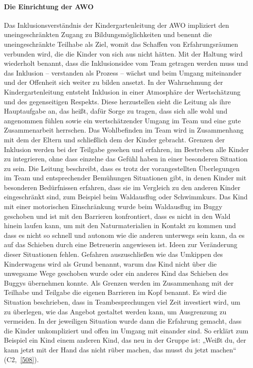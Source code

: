 \paragraph{Die Einrichtung der AWO}
Das Inklusionsverständnis der Kindergartenleitung der AWO impliziert den uneingeschränkten Zugang zu Bildungsmöglichkeiten und benennt die uneingeschränkte Teilhabe als Ziel, womit das Schaffen von Erfahrungsräumen verbunden wird, die die Kinder von sich aus nicht hätten. 
Mit der Haltung wird wiederholt benannt, dass die Inklusionsidee vom Team getragen werden muss und das Inklusion -- verstanden als Prozess -- wächst und beim Umgang miteinander und der Offenheit sich weiter zu bilden ansetzt. In der Wahrnehmung der Kindergartenleitung entsteht Inklusion in einer Atmosphäre der Wertschätzung und des gegenseitigen Respekts. Diese herzustellen sieht die Leitung als ihre Hauptaufgabe an, das heißt, dafür Sorge zu tragen, dass sich alle wohl und angenommen fühlen sowie ein wertschätzender Umgang im Team und eine gute Zusammenarbeit herrschen. Das Wohlbefinden im Team wird in Zusammenhang mit dem der Eltern und schließlich dem der Kinder gebracht. 
Grenzen der Inklusion werden bei der Teilgabe gesehen und erfahren, im Bestreben alle Kinder zu integrieren, ohne dass einzelne das Gefühl haben in einer besonderen Situation zu sein.    
Die Leitung beschreibt, dass es trotz der vorangestellten Überlegungen im Team und entsprechender Bemühungen Situationen gibt, in denen Kinder mit besonderen Bedürfnissen erfahren, dass sie im Vergleich zu den anderen Kinder eingeschränkt sind, zum Beispiel beim Waldausflug oder Schwimmkurs.
Das Kind mit einer motorischen Einschränkung wurde beim Waldausflug im Buggy geschoben und ist mit den Barrieren konfrontiert, dass es nicht in den Wald hinein laufen kann, um mit den Naturmaterialien in Kontakt zu kommen und dass es nicht so schnell und autonom wie die anderen unterwegs sein kann, da es auf das Schieben durch eine Betreuerin angewiesen ist. Ideen zur Veränderung dieser Situationen fehlen. Gefahren auszuschließen wie das Umkippen des Kinderwagens wird als Grund benannt, warum das Kind nicht über die unwegsame Wege geschoben wurde oder ein anderes Kind das Schieben des Buggys übernehmen konnte. Als Grenzen werden im Zusammenhang mit der Teilhabe und Teilgabe die eigenen Barrieren im Kopf benannt. Es wird die Situation beschrieben, dass in Teambesprechungen viel Zeit investiert wird, um zu überlegen, wie das Angebot gestaltet werden kann, um Ausgrenzung zu vermeiden. In der jeweiligen Situation wurde dann die Erfahrung gemacht, dass die Kinder unkompliziert und offen im Umgang mit einander sind. So erklärt zum Beispiel ein Kind einem anderen Kind, das neu in der Gruppe ist: „Weißt du, der kann jetzt mit der Hand das nicht rüber machen, das musst du jetzt machen“ (C2,~\ref{508}).  

